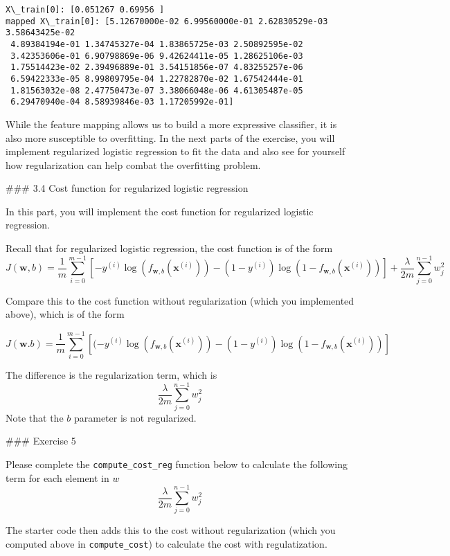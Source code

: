 \documentclass[11pt]{article}
\begin{document}
    \begin{Verbatim}[commandchars=\\\{\}]
X\_train[0]: [0.051267 0.69956 ]
mapped X\_train[0]: [5.12670000e-02 6.99560000e-01 2.62830529e-03 3.58643425e-02
 4.89384194e-01 1.34745327e-04 1.83865725e-03 2.50892595e-02
 3.42353606e-01 6.90798869e-06 9.42624411e-05 1.28625106e-03
 1.75514423e-02 2.39496889e-01 3.54151856e-07 4.83255257e-06
 6.59422333e-05 8.99809795e-04 1.22782870e-02 1.67542444e-01
 1.81563032e-08 2.47750473e-07 3.38066048e-06 4.61305487e-05
 6.29470940e-04 8.58939846e-03 1.17205992e-01]
    \end{Verbatim}

    While the feature mapping allows us to build a more expressive
classifier, it is also more susceptible to overfitting. In the next
parts of the exercise, you will implement regularized logistic
regression to fit the data and also see for yourself how regularization
can help combat the overfitting problem.

\#\#\# 3.4 Cost function for regularized logistic regression

In this part, you will implement the cost function for regularized
logistic regression.

Recall that for regularized logistic regression, the cost function is of
the form
\[J(\mathbf{w},b) = \frac{1}{m}  \sum_{i=0}^{m-1} \left[ -y^{(i)} \log\left(f_{\mathbf{w},b}\left( \mathbf{x}^{(i)} \right) \right) - \left( 1 - y^{(i)}\right) \log \left( 1 - f_{\mathbf{w},b}\left( \mathbf{x}^{(i)} \right) \right) \right] + \frac{\lambda}{2m}  \sum_{j=0}^{n-1} w_j^2\]

Compare this to the cost function without regularization (which you
implemented above), which is of the form

\[ J(\mathbf{w}.b) = \frac{1}{m}\sum_{i=0}^{m-1} \left[ (-y^{(i)} \log\left(f_{\mathbf{w},b}\left( \mathbf{x}^{(i)} \right) \right) - \left( 1 - y^{(i)}\right) \log \left( 1 - f_{\mathbf{w},b}\left( \mathbf{x}^{(i)} \right) \right)\right]\]

The difference is the regularization term, which is
\[\frac{\lambda}{2m}  \sum_{j=0}^{n-1} w_j^2\] Note that the \(b\)
parameter is not regularized.

    \#\#\# Exercise 5

Please complete the \texttt{compute\_cost\_reg} function below to
calculate the following term for each element in \(w\)
\[\frac{\lambda}{2m}  \sum_{j=0}^{n-1} w_j^2\]

The starter code then adds this to the cost without regularization
(which you computed above in \texttt{compute\_cost}) to calculate the
cost with regulatization.
\end{document}
